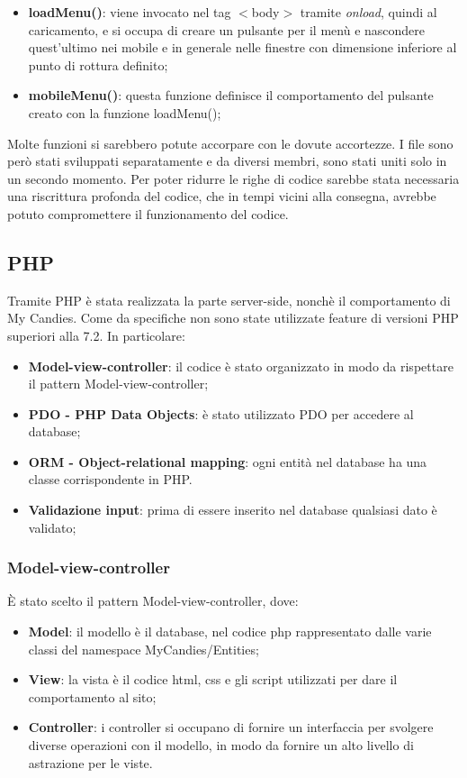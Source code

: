 \begin{itemize}
    \item \textbf{loadMenu()}: viene invocato nel tag $<$body$>$ tramite \textit{onload}, quindi al caricamento, e si occupa di creare un pulsante per il menù e nascondere quest'ultimo nei mobile e in generale nelle finestre con dimensione inferiore al punto di rottura definito;
    
    \item \textbf{mobileMenu()}: questa funzione definisce il comportamento del pulsante creato con la funzione loadMenu();
    
\end{itemize}
Molte funzioni si sarebbero potute accorpare con le dovute accortezze. I file sono però stati sviluppati separatamente e da diversi membri, sono stati uniti solo in un secondo momento. Per poter ridurre le righe di codice sarebbe stata necessaria una riscrittura profonda del codice, che in tempi vicini alla consegna, avrebbe potuto compromettere il funzionamento del codice.
\subsection{PHP}
Tramite PHP è stata realizzata la parte server-side, nonchè il comportamento di My Candies. Come da specifiche non sono state utilizzate feature di versioni PHP superiori alla 7.2.
In particolare:
\begin{itemize}
    \item \textbf{Model-view-controller}: il codice è stato organizzato in modo da rispettare il pattern Model-view-controller;
    \item \textbf{PDO - PHP Data Objects}: è stato utilizzato PDO per accedere al database;
    \item \textbf{ORM - Object-relational mapping}: ogni entità nel database ha una classe corrispondente in PHP.
    \item \textbf{Validazione input}: prima di essere inserito nel database qualsiasi dato è validato;
\end{itemize}

\subsubsection{Model-view-controller}
È stato scelto il pattern Model-view-controller, dove:
\begin{itemize}
    \item \textbf{Model}: il modello è il database, nel codice php rappresentato dalle varie classi del namespace MyCandies/Entities;
    \item \textbf{View}: la vista è il codice html, css e gli script utilizzati per dare il comportamento al sito;
     \item \textbf{Controller}: i controller si occupano di fornire un interfaccia per svolgere diverse operazioni con il modello, in modo da fornire un alto livello di astrazione per le viste.
\end{itemize}
